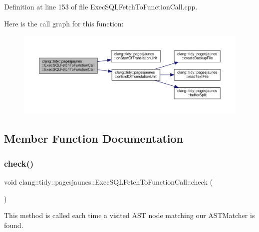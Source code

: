 Definition at line 153 of file Exec\+S\+Q\+L\+Fetch\+To\+Function\+Call.\+cpp.

Here is the call graph for this function\+:
\nopagebreak
\begin{figure}[H]
\begin{center}
\leavevmode
\includegraphics[width=350pt]{classclang_1_1tidy_1_1pagesjaunes_1_1_exec_s_q_l_fetch_to_function_call_a1500e29a6edf8513cb3fc58538b3ebce_cgraph}
\end{center}
\end{figure}


\subsection{Member Function Documentation}
\mbox{\label{classclang_1_1tidy_1_1pagesjaunes_1_1_exec_s_q_l_fetch_to_function_call_ad12827794322cf0b75a4a5ff19db75e2}} 
\subsubsection{\texorpdfstring{check()}{check()}}
{\footnotesize\ttfamily void clang\+::tidy\+::pagesjaunes\+::\+Exec\+S\+Q\+L\+Fetch\+To\+Function\+Call\+::check (\begin{DoxyParamCaption}\item[{const ast\+\_\+matchers\+::\+Match\+Finder\+::\+Match\+Result \&}]{ }\end{DoxyParamCaption})\hspace{0.3cm}{\ttfamily [override]}}



This method is called each time a visited A\+ST node matching our A\+S\+T\+Matcher is found. 

